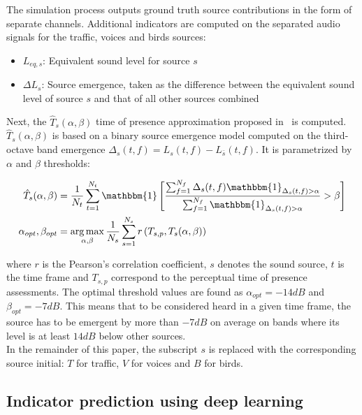 \documentclass[11pt,a4paper]{article}
\DeclareMathOperator*{\argmax}{arg\,max}
\begin{document}
The simulation process outputs ground truth source contributions in the form of separate channels. Additional indicators are computed on the separated audio signals for the traffic, voices and birds sources:

\begin{itemize}
\item $L_{eq, s}$: Equivalent sound level for source $s$
\item $\Delta L_{s}$: Source emergence, taken as the difference between the equivalent sound level of source $s$ and that of all other sources combined
\end{itemize}

Next, the $\hat T_s(\alpha, \beta)$ time of presence approximation proposed in~\cite{gontier2018} is computed. $\hat T_s(\alpha, \beta)$ is based on a binary source emergence model computed on the third-octave band emergence $\Delta_s(t, f) = L_s(t, f) - L_{\bar{s}}(t, f)$. It is parametrized by $\alpha$ and $\beta$ thresholds:

\begin{align}
\hat T_s(\alpha, \beta) &= \frac{1}{N_t}\sum_{t = 1}^{N_t}\mathbbm{1}\left[ \frac{\sum_{f = 1}^{N_f}\Delta_s(t, f)\mathbbm{1}_{\Delta_s(t, f)>\alpha}}{\sum_{f = 1}^{N_f}\mathbbm{1}_{\Delta_s(t, f)>\alpha}}>\beta \right]\\
\alpha_{opt},\beta_{opt} &= \argmax_{\alpha, \beta}\frac{1}{N_s}\sum_{s = 1}^{N_s}r\left(T_{s, p}, T_s(\alpha, \beta)\right)
\end{align}

where $r$ is the Pearson's correlation coefficient, $s$ denotes the sound source, $t$ is the time frame and $T_{s, p}$ correspond to the perceptual time of presence assessments. The optimal threshold values are found as $\alpha_{opt} = -14dB$ and $\beta_{opt} = -7dB$. This means that to be considered heard in a given time frame, the source has to be emergent by more than $-7dB$ on average on bands where its level is at least $14dB$ below other sources.\\

In the remainder of this paper, the subscript $s$ is replaced with the corresponding source initial: $T$ for traffic, $V$ for voices and $B$ for birds.


\subsection{Indicator prediction using deep learning}
\label{sec:methods_deep}
\end{document}
